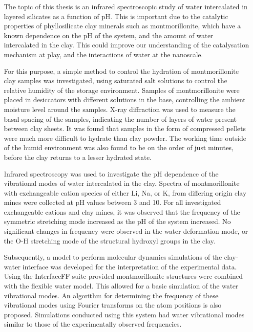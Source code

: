 

The topic of this thesis is an infrared spectroscopic study of water intercalated in layered silicates as a function of pH. This is important due to the catalytic properties of phyllosilicate clay minerals such as montmorillonite, which have a known dependence on the pH of the system, and the amount of water intercalated in the clay. This could improve our understanding of the catalysation mechanism at play, and the interactions of water at the nanoscale.

For this purpose, a simple method to control the hydration of montmorillonite clay samples was investigated, using saturated salt solutions to control the relative humidity of the storage environment. Samples of montmorillonite were placed in desiccators with different solutions in the base, controlling the ambient moisture level around the samples. X-ray diffraction was used to measure the basal spacing of the samples, indicating the number of layers of water present between clay sheets. It was found that samples in the form of compressed pellets were much more difficult to hydrate than clay powder. The working time outside of the humid environment was also found to be on the order of just minutes, before the clay returns to a lesser hydrated state. 

Infrared spectroscopy was used to investigate the pH dependence of the vibrational modes of water intercalated in the clay. Spectra of montmorillonite with exchangeable cation species of either Li, Na, or K, from differing origin clay mines were collected at pH values between 3 and 10. For all investigated exchangeable cations and clay mines, it was observed that the frequency of the symmetric stretching mode increased as the pH of the system increased. No significant changes in frequency were observed in the water deformation mode, or the O-H stretching mode of the structural hydroxyl groups in the clay.

Subsequently, a model to perform molecular dynamics simulations of the clay-water interface was developed for the interpretation of the experimental data. Using the InterfaceFF suite provided montmorillonite structures were combined with the flexible water model. This allowed for a basic simulation of the water vibrational modes. An algorithm for determining the frequency of these vibrational modes using Fourier transforms on the atom positions is also proposed. Simulations conducted using this system had water vibrational modes similar to those of the experimentally observed frequencies.